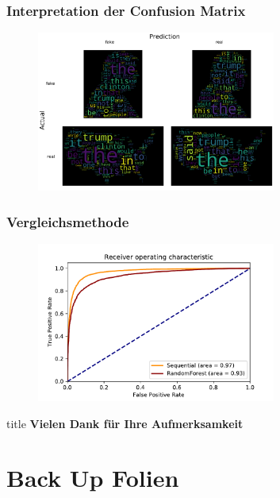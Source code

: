 \documentclass[aspectratio=1610, professionalfonts, 9pt]{beamer}
\begin{document}
  \begin{frame}
    \frametitle{Interpretation der Confusion Matrix}
    \begin{figure}
      \includegraphics[width=0.7\textwidth]{pictures/bow/cnfn_wordcloud.pdf}
      \caption{}
      \label{}
    \end{figure}
  \end{frame}

  \begin{frame}
    \frametitle{Vergleichsmethode}
    \begin{figure}
      \includegraphics[width=0.7\textwidth]{pictures/bow/roc_comparison.pdf}
      \caption{}
      \label{}
    \end{figure}
  \end{frame}

  \begin{frame}
    \vfill
    \centering
    \begin{beamercolorbox}[sep=8pt,center,shadow=false,rounded=true]{title}
      \huge{\textbf{Vielen Dank für Ihre Aufmerksamkeit}}
    \end{beamercolorbox}
  \end{frame}

\section{Back Up Folien}
\end{document}
